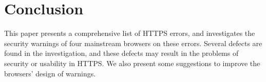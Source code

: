 \section{Conclusion}
This paper presents a comprehensive list of HTTPS errors,
 and investigates the security warnings of four mainstream browsers on these errors.
Several defects are found in the investigation,
 and these defects may result in the problems of security or usability in HTTPS.
We also present some suggestions to improve the browsers' design of warnings.

